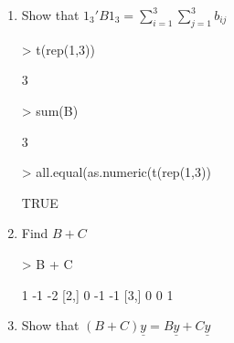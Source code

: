 \documentclass[12pt,a4paper]{paper}
\begin{document}
\begin{enumerate}
\begin{enumerate}
\begin{enumerate}
\end{enumerate}
\item Show that $1_{3}'B1_{3} = \sum_{i=1}^{3}{\sum_{j=1}^{3}{b_{ij}}}$
\begin{Schunk}
\begin{Sinput}
> t(rep(1,3)) %*% B %*% rep(1,3)
\end{Sinput}
\begin{Soutput}
     [,1]
[1,]    3
\end{Soutput}
\begin{Sinput}
> sum(B)
\end{Sinput}
\begin{Soutput}
[1] 3
\end{Soutput}
\begin{Sinput}
> all.equal(as.numeric(t(rep(1,3)) %*% B %*% rep(1,3)), sum(B))
\end{Sinput}
\begin{Soutput}
[1] TRUE
\end{Soutput}
\end{Schunk}
\item Find $B + C$
\begin{Schunk}
\begin{Sinput}
> B + C
\end{Sinput}
\begin{Soutput}
     [,1] [,2] [,3]
[1,]    1   -1   -2
[2,]    0   -1   -1
[3,]    0    0    1
\end{Soutput}
\end{Schunk}
\item Show that $(B + C)\underline{y} = B\underline{y} + C\underline{y}$
\begin{Schunk}

\end{Schunk}
\end{enumerate}
\end{enumerate}
\end{document}
